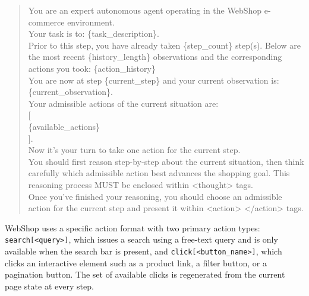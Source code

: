 \documentclass[11pt]{article}
\begin{document}
\begin{quote}
\small\ttfamily
You are an expert autonomous agent operating in the WebShop e-commerce environment.\\[2pt]
Your task is to: \{task\_description\}.\\[2pt]
Prior to this step, you have already taken \{step\_count\} step(s). Below are the most recent \{history\_length\} observations and the corresponding actions you took: \{action\_history\}\\[2pt]
You are now at step \{current\_step\} and your current observation is: \{current\_observation\}.\\[2pt]
Your admissible actions of the current situation are:\\
{[}\\
\{available\_actions\}\\
{]}.\\[6pt]
Now it's your turn to take one action for the current step.\\[2pt]
You should first reason step-by-step about the current situation, then think carefully which admissible action best advances the shopping goal. This reasoning process MUST be enclosed within <thought> tags.\\[2pt]
Once you've finished your reasoning, you should choose an admissible action for the current step and present it within <action> </action> tags.
\end{quote}

WebShop uses a specific action format with two primary action types: \texttt{search[<query>]}, which issues a search using a free-text query and is only available when the search bar is present, and \texttt{click[<button\_name>]}, which clicks an interactive element such as a product link, a filter button, or a pagination button. The set of available clicks is regenerated from the current page state at every step.
\end{document}
